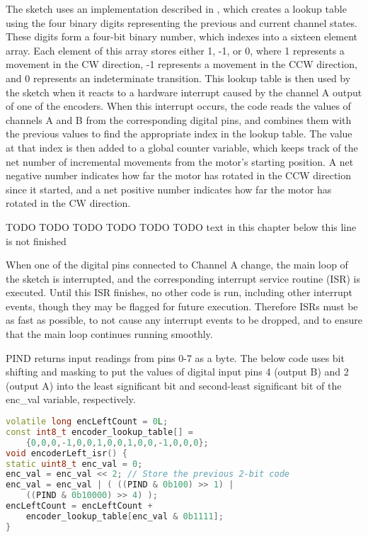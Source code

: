 The sketch uses an implementation described in \cite{encoderBlog}, which creates a lookup table using the four binary digits representing the previous and current channel states. These digits form a four-bit binary number, which indexes into a sixteen element array. Each element of this array stores either 1, -1, or 0, where 1 represents a movement in the CW direction, -1 represents a movement in the CCW direction, and 0 represents an indeterminate transition. This lookup table is then used by the sketch when it reacts to a hardware interrupt caused by the channel A output of one of the encoders. When this interrupt occurs, the code reads the values of channels A and B from the corresponding digital pins, and combines them with the previous values to find the appropriate index in the lookup table. The value at that index is then added to a global counter variable, which keeps track of the net number of incremental movements from the motor's starting position. A net negative number indicates how far the motor has rotated in the CCW direction since it started, and a net positive number indicates how far the motor has rotated in the CW direction. \cite{encoderBlog}



TODO TODO TODO
TODO TODO TODO
text in this chapter below this line is not finished

When one of the digital pins connected to Channel A change, the main loop of the sketch is interrupted, and the corresponding interrupt service routine (ISR) is executed. Until this ISR finishes, no other code is run, including other interrupt events, though they may be flagged for future execution. Therefore ISRs must be as fast as possible, to not cause any interrupt events to be dropped, and to ensure that the main loop continues running smoothly.

PIND returns input readings from pins 0-7 as a byte.
The below code uses bit shifting and masking to put
the values of digital input pins 4 (output B) and 
2 (output A) into the least significant bit and 
second-least significant bit of the enc\_val 
variable, respectively.

\begin{mdframed}[backgroundcolor=light-gray, roundcorner=10pt,leftmargin=1, rightmargin=1, innerleftmargin=15, innertopmargin=15,innerbottommargin=15, outerlinewidth=1, linecolor=light-gray]
\begin{lstlisting}[language=C++]
volatile long encLeftCount = 0L;
const int8_t encoder_lookup_table[] =
    {0,0,0,-1,0,0,1,0,0,1,0,0,-1,0,0,0};
void encoderLeft_isr() {
static uint8_t enc_val = 0;
enc_val = enc_val << 2; // Store the previous 2-bit code
enc_val = enc_val | ( ((PIND & 0b100) >> 1) |
    ((PIND & 0b10000) >> 4) );
encLeftCount = encLeftCount + 
    encoder_lookup_table[enc_val & 0b1111];
}
\end{lstlisting}
\end{mdframed}

